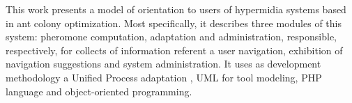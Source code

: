 This work presents a model of orientation to users of
hypermidia systems based in ant colony optimization. Most
specifically, it describes three modules of this system: pheromone
computation, adaptation and administration, responsible, respectively,
for collects of information referent a user navigation, exhibition
of navigation suggestions and system administration. It uses as development methodology a Unified Process adaptation , UML
for tool modeling, PHP language and object-oriented programming.
